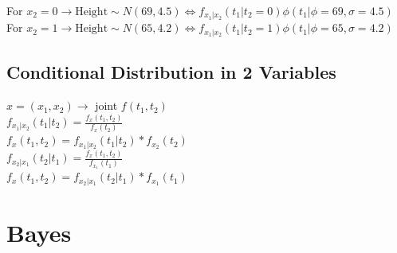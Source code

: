 \documentclass{article}
\begin{document}
{{{            For $x_2= 0 \rightarrow \text{Height} \sim N(69,4.5) \Leftrightarrow f_{x_1|x_2}(t_1|t_2= 0)\phi( t_1|\phi=69, \sigma= 4.5)$\\

            For $x_2= 1 \rightarrow \text{Height} \sim N(65,4.2)\Leftrightarrow f_{x_1|x_2}(t_1|t_2= 1)\phi( t_1|\phi=65, \sigma= 4.2)$\\
            
        } 
        
    }

    \subsection{Conditional Distribution in 2 Variables}{
        $x=(x_1, x_2) \rightarrow$ joint  $f(t_1,t_2)$
        \\$f_{x_1|x_2}(t_1|t_2)=\frac{ f_x(t_1,t_2)}{f_x(t_2)}$
        \\$f_x(t_1, t_2)=  f_{x_1|x_2}(t_1|t_2)*f_{x_2}(t_2)$
        \\$f_{x_2|x_1}(t_2|t_1)=\frac{ f_x(t_1,t_2)}{f_{x_1}(t_1)}$
        \\$f_x(t_1, t_2)=  f_{x_2|x_1}(t_2|t_1)*f_{x_1}(t_1)$
    }
}

\section{Bayes} 
\end{document}
